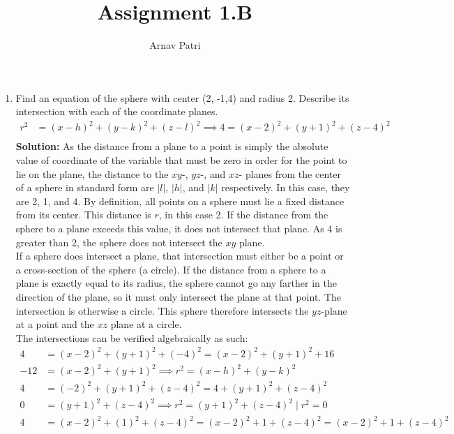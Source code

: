 \documentclass{article}[A4, 12pt]
\title{Assignment 1.B}
\author{Arnav Patri}
\begin{document}
	\maketitle
	\begin{enumerate}
		\item
			Find an equation of the sphere with center (2, -1,4)  and radius 2. Describe its intersection with each of the coordinate planes.
			\begin{align*}
				r^2 &=(x - h)^2 + (y - k)^2 + (z - l)^2 \implies 4 = (x - 2)^2 +(y + 1)^2 + (z - 4)^2 \\
			\end{align*}
			\textbf{Solution:}
			As the distance from a plane to a point is simply the absolute value of coordinate of the variable that must be zero in order for the point to lie on the plane, the distance to the $xy$-, $yz$-, and $xz$- planes from the center of a sphere in standard form are $|l|$, $|h|$, and $|k|$ respectively. In this case, they are 2, 1, and 4. By definition, all points on a sphere must lie a fixed distance from its center. This distance is $r$, in this case 2. If the distance from the sphere to a plane exceeds this value, it does not intersect that plane. As 4 is greater than 2, the sphere does not intersect the $xy$ plane. \\
			If a sphere does intersect a plane, that intersection must either be a point or a cross-section of the sphere (a circle). If the distance from a sphere to a plane is exactly equal to its radius, the sphere cannot go any farther in the direction of the plane, so it must only intersect the plane at that point. The intersection is otherwise a circle. This sphere therefore intersects the $yz$-plane at a point and the $xz$ plane at a circle. \\
			The intersections can be verified algebraically as such:
			\begin{align*}
				4 &= (x - 2)^2 + (y + 1)^2 + (-4)^2 
						= (x - 2)^2 + (y + 1)^2 + 16  \tag{$xy$} \\
					-12 &= (x - 2)^2 + (y + 1)^2 
						\implies r^2 = (x - h)^2 + (y - k)^2 \\
				4 &= (-2)^2 + (y + 1)^2 + (z - 4)^2 
						= 4 + (y + 1)^2 + (z - 4)^2 \tag{$yz$} \\
					0 &= (y + 1)^2 + (z - 4)^2 
						\implies r^2 = (y + 1)^2 + (z - 4)^2 \mid r^2 = 0\\
				4 &= (x - 2)^2 + (1)^2 + (z - 4)^2 = (x - 2)^2 + 1 + (z - 4)^2
						= (x - 2)^2 + 1 + (z - 4)^2  \tag{$xz$} \\

\end{align*}
\end{enumerate}
\end{document}

